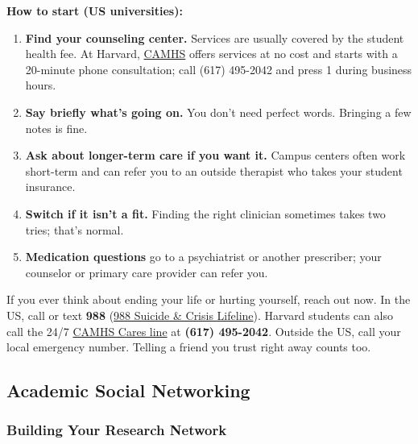 \documentclass[11pt,a4paper]{article}
\begin{document}
\textbf{How to start (US universities):}
\begin{enumerate}
    \item \textbf{Find your counseling center.} Services are usually covered by the student health fee. At Harvard, \href{https://camhs.huhs.harvard.edu/}{CAMHS} offers services at no cost and starts with a 20-minute phone consultation; call (617) 495-2042 and press 1 during business hours.
    \item \textbf{Say briefly what's going on.} You don't need perfect words. Bringing a few notes is fine.
    \item \textbf{Ask about longer-term care if you want it.} Campus centers often work short-term and can refer you to an outside therapist who takes your student insurance.
    \item \textbf{Switch if it isn't a fit.} Finding the right clinician sometimes takes two tries; that's normal.
    \item \textbf{Medication questions} go to a psychiatrist or another prescriber; your counselor or primary care provider can refer you.
\end{enumerate}

\begin{tcolorbox}[colback=red!5,colframe=red!50,title={If You Are in Crisis}]
If you ever think about ending your life or hurting yourself, reach out now. In the US, call or text \textbf{988} (\href{https://988lifeline.org/}{988 Suicide \& Crisis Lifeline}). Harvard students can also call the 24/7 \href{https://camhs.huhs.harvard.edu/our-services/camhs-cares-line}{CAMHS Cares line} at \textbf{(617) 495-2042}. Outside the US, call your local emergency number. Telling a friend you trust right away counts too.
\end{tcolorbox}

\subsection{Academic Social Networking}

\subsubsection{Building Your Research Network}
\end{document}
